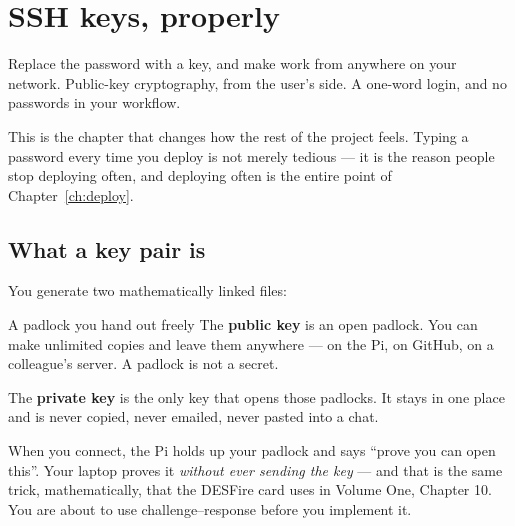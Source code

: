 \chapter{SSH keys, properly}
\label{ch:sshkeys}

\chapterbrief
  {Replace the password with a key, and make  work from anywhere on your network.}
  {Public-key cryptography, from the user's side.}
  {A one-word login, and no passwords in your workflow.}

This is the chapter that changes how the rest of the project feels. Typing a
password every time you deploy is not merely tedious --- it is the reason people
stop deploying often, and deploying often is the entire point of
Chapter~\ref{ch:deploy}.

\section{What a key pair is}

You generate two mathematically linked files:

\begin{center}
\end{center}

\begin{analogy}{A padlock you hand out freely}
The \textbf{public key} is an open padlock. You can make unlimited copies and
leave them anywhere --- on the Pi, on GitHub, on a colleague's server. A padlock
is not a secret.

The \textbf{private key} is the only key that opens those padlocks. It stays in
one place and is never copied, never emailed, never pasted into a chat.

When you connect, the Pi holds up your padlock and says ``prove you can open
this''. Your laptop proves it \emph{without ever sending the key} --- and that
is the same trick, mathematically, that the DESFire card uses in Volume One,
Chapter 10. You are about to use challenge--response before you implement it.
\end{analogy}

